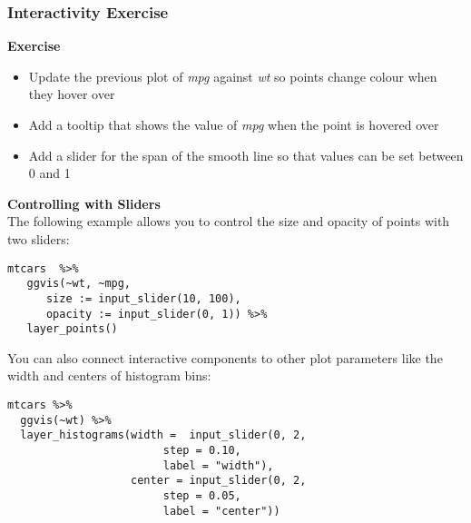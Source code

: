 \documentclass[MASTER.tex]{subfiles}
\begin{document}
	\begin{frame}
	\frametitle{Interactivity Exercise}
	\Large
	\textbf{Exercise}
	\begin{itemize}
	\item Update the previous plot of \textit{mpg} against \textit{wt} so
	points change colour when they hover over
	\item Add a tooltip that shows the value of \textit{mpg} when
	the point is hovered over
	\item Add a slider for the span of the smooth line so
	that values can be set between 0 and 1
	
	\end{itemize}
	\end{frame}
\begin{frame}[fragile]
\Large
\textbf{Controlling with Sliders}\\

	The following example allows you to control the size and opacity of points with two sliders:
{
\large
\begin{framed}
\begin{verbatim}
mtcars  %>% 
   ggvis(~wt, ~mpg, 
      size := input_slider(10, 100),
      opacity := input_slider(0, 1)) %>% 
   layer_points()
\end{verbatim}
\end{framed}
}
\end{frame}
\begin{frame}[fragile]
	\Large
You can also connect interactive components to other plot parameters like the width and centers of histogram bins:
{
	\large
\begin{framed}
	\begin{verbatim}
mtcars %>% 
  ggvis(~wt) %>% 
  layer_histograms(width =  input_slider(0, 2, 
                        step = 0.10, 
                        label = "width"),
                   center = input_slider(0, 2,
                        step = 0.05, 
                        label = "center"))
\end{verbatim}
\end{framed}
}
\end{frame}
\end{document}

